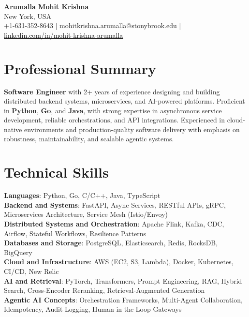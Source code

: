 \documentclass[letterpaper,11pt]{article}
\begin{document}
\begin{center}
  {\Large \textbf{Arumalla Mohit Krishna}} \\
  New York, USA \\
  +1-631-352-8643 \enspace | \enspace mohitkrishna.arumalla@stonybrook.edu \enspace | \enspace \href{https://www.linkedin.com/in/mohit-krishna-arumalla}{linkedin.com/in/mohit-krishna-arumalla}
\end{center}

\section{Professional Summary}
  \begin{itemize}[leftmargin=0.15in, label={}]
    \small{\item{
     \textbf{Software Engineer} with 2+ years of experience designing and building distributed backend systems, microservices, and AI-powered platforms. Proficient in \textbf{Python}, \textbf{Go}, and \textbf{Java}, with strong expertise in asynchronous service development, reliable orchestrations, and API integrations. Experienced in cloud-native environments and production-quality software delivery with emphasis on robustness, maintainability, and scalable agentic systems.
    }}
  \end{itemize}
\vspace{-16pt}

\section{Technical Skills}
 \begin{itemize}[leftmargin=0.15in, label={}]
    \small{\item{
     \textbf{Languages}: Python, Go, C/C++, Java, TypeScript \\
     \textbf{Backend and Systems}: FastAPI, Async Services, RESTful APIs, gRPC, Microservices Architecture, Service Mesh (Istio/Envoy) \\
     \textbf{Distributed Systems and Orchestration}: Apache Flink, Kafka, CDC, Airflow, Stateful Workflows, Resilience Patterns \\
     \textbf{Databases and Storage}: PostgreSQL, Elasticsearch, Redis, RocksDB, BigQuery \\
     \textbf{Cloud and Infrastructure}: AWS (EC2, S3, Lambda), Docker, Kubernetes, CI/CD, New Relic \\
     \textbf{AI and Retrieval}: PyTorch, Transformers, Prompt Engineering, RAG, Hybrid Search, Cross-Encoder Reranking, Retrieval-Augmented Generation \\
     \textbf{Agentic AI Concepts}: Orchestration Frameworks, Multi-Agent Collaboration, Idempotency, Audit Logging, Human-in-the-Loop Gateways
    }}
 \end{itemize}
\vspace{-16pt}
\end{document}
